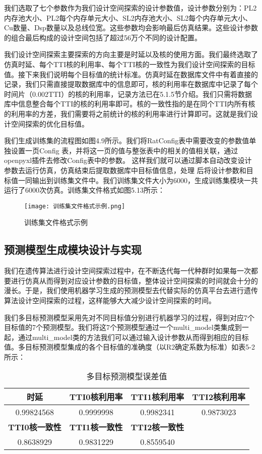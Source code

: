 我们选取了七个参数作为我们设计空间探索的设计参数值，设计参数分别为：PL2内存池大小、PL2每个内存单元大小、SL2内存池大小、SL2每个内存单元大小、Cu数量、Dsp数量以及总线位宽。这些参数均会影响最后仿真结果。这些设计参数的组合最后构成的设计空间包括了超过56万个不同的设计配置。

我们设计空间探索主要探索的方向主要是时延以及核的使用方面。我们最终选取了仿真时延、每个TTI核的利用率、每个TTI核的一致性为我们设计空间探索的目标值。接下来我们说明每个目标值的统计标准。仿真时延在数据库文件中有着直接的记录，我们只需直接提取数据库中的信息即可，核的利用率在数据库中记录了每个时间片（0.002TTI）的核的利用率，记录方法已在5.1.5节介绍。我们只需将数据库中信息整合每个TTI的核的利用率即可。核的一致性指的是在同个TTI内所有核的利用率的方差，我们需要将之前统计的核的利用率进行计算即可。这就是我们设计空间探索的优化目标值。

我们生成训练集的流程图如图4.9所示。我们将RatConfig表中需要改变的参数值单独设置一页Config
表，并将这一页的值与整张表中的相关的值相关联，通过openpyxl插件去修改Config表中的参数。
这样我们就可以通过脚本自动改变设计参数去运行仿真，仿真结束后提取数据库中目标值信息，处理
后将设计参数和目标值一同输出到训练集文件中。我们训练集文件大小为6000，生成训练集模块一共
运行了6000次仿真。训练集文件格式如图5.13所示：

\begin{figure}
    \centering
    \texttt{[image: 训练集文件格式示例.png]}
    \caption{训练集文件格式示例}
    \label{fig:badge}
\end{figure}

\subsection{预测模型生成模块设计与实现}

我们在遗传算法进行设计空间探索过程中，在不断迭代每一代种群时如果每一次都要进行仿真从而得到对应设计参数的目标值，整体设计空间探索的时间就会十分的漫长。于是，我们使用机器学习生成的预测模型去代替实际的仿真平台去进行遗传算法设计空间探索的过程，这样能够大大减少设计空间探索的时间。

我们多目标预测模型采用先对不同目标值分别进行机器学习的过程，得到对应7个目标值的7个预测模型。我们将这7个预测模型通过一个multi\_model类集成到一起，通过multi\_model类的方法我们可以通过输入设计参数从而得到相应的目标值。多目标预测模型集成的各个目标值的准确度（以R2确定系数为标准）如表5-2所示：

\begin{table}[!h]
    \centering\normalsize
    \caption{多目标预测模型误差值}
    \begin{tabular}{|c|c|c|c|}
    \hline
    \textbf{时延}       & \textbf{TTI0核利用率} & \textbf{TTI1核利用率} & \textbf{TTI2核利用率} \\ \hline
    0.99824568        & 0.9999998         & 0.9982341         & 0.9873023         \\ \hline
    \textbf{TTI0核一致性} & \textbf{TTI1核一致性} & \textbf{TTI2核一致性} & \textbf{}         \\ \hline
    0.8638929         & 0.9831229         & 0.8559540         &                   \\ \hline
    \end{tabular}
    \end{table}

